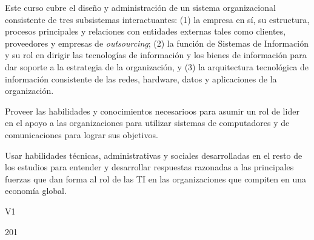 \begin{syllabus}


\begin{justification}
Este curso cubre el diseño y administración de un sistema organizacional consistente de tres subsistemas interactuantes: (1) la empresa en sí, su estructura, procesos principales y relaciones con entidades externas tales como clientes, proveedores y empresas de \emph{outsourcing}; (2) la función de Sistemas de Información y su rol en dirigir las tecnologías de información y los bienes de información para dar soporte a la estrategia de la organización, y (3) la arquitectura tecnológica de información consistente de las redes, hardware, datos y aplicaciones de la organización. 
\end{justification}

\begin{goals}
\item Proveer las habilidades y conocimientos necesarioos para asumir un rol de lider en el apoyo a las organizaciones para utilizar sistemas de computadores y de comunicaciones para lograr sus objetivos. 
\item Usar habilidades técnicas, administrativas y sociales desarrolladas en el resto de los estudios para entender y desarrollar respuestas razonadas a las principales fuerzas que dan forma al rol de las TI en las organizaciones que compiten en una economía global.
\end{goals}

\begin{outcomes}{V1}
\end{outcomes}

\begin{unit}{\LUTWOONETWODef}{}{\LUTWOONETWOBib}{20}{1}
   \begin{topics}
   	\item \OMCONETopicTWOxONExONEOH
   	\item \OMCONEONETopicTWOxONEONExONE
   	\item \OMCONEONETopicTWOxONEONExONEFIVE
	\item \OMCONETopicTWOxONExNINE
	\begin{subtopics}
		\item \OMCONETopicTWOxONExNINExSEVEN
		\item \OMCONETopicTWOxONExNINExEIGHT
		\item \OMCONETopicTWOxONExNINExNINE
	\end{subtopics} 	
   	\item \OMCTHREETopicTWOxTHREExTHREE
   	\item \OMCTWOTopicTWOxTWOxONEOH
   \end{topics}
	\LUTWOONETWOGoal
\end{unit}


\end{syllabus}
